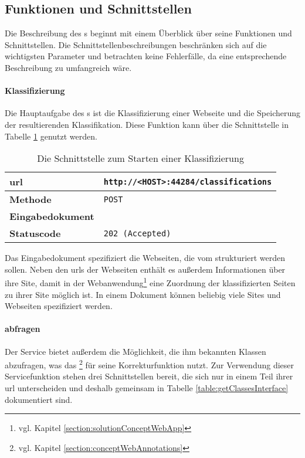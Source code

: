 \subsection{Funktionen und Schnittstellen}
    \label{section:solutionDetailsClassificationServiceFunctions}
    Die Beschreibung des {\classificationService}s beginnt mit einem
    Überblick über seine Funktionen und Schnittstellen.
    Die Schnittstellenbeschreibungen beschränken sich auf die wichtigsten
    Parameter und betrachten keine Fehlerfälle,
    da eine entsprechende Beschreibung zu umfangreich wäre.

    \paragraph*{Klassifizierung}
    Die Hauptaufgabe des {\classificationService}s ist die Klassifizierung einer Webseite
    und die Speicherung der resultierenden Klassifikation.
    Diese Funktion kann über die Schnittstelle in Tabelle \ref{table:startClassificationInterface} genutzt werden.

    \begin{table}[htb]
        \centering
        \begin{tabular}{|l|l|}
        \hline
        \textbf{\gls{url}} & \texttt{http://<HOST>:44284/classifications}\\
        \hline
        \textbf{Methode} & \texttt{POST}\\
        \hline
        \textbf{Eingabedokument} & \\
        \hline
        \textbf{Statuscode} & \texttt{202 (Accepted)}\\
        \hline
        \end{tabular}
        \caption{Die Schnittstelle zum Starten einer Klassifizierung}
        \label{table:startClassificationInterface}
    \end{table}

    Das Eingabedokument spezifiziert die Webseiten,
    die vom {\classificationService} strukturiert werden sollen.
    Neben den \glspl{url} der Webseiten enthält es außerdem Informationen über ihre Site,
    damit in der Webanwendung\footnote{vgl. Kapitel \ref{section:solutionConceptWebApp}}
    eine Zuordnung der klassifizierten Seiten zu ihrer Site möglich ist.
    In einem Dokument können beliebig viele Sites und Webseiten spezifiziert werden.

    \paragraph*{{\classificationModel} abfragen}
    Der Service bietet außerdem die Möglichkeit, die ihm bekannten Klassen abzufragen,
    was das {\annotatorPlugin}\footnote{vgl. Kapitel \ref{section:conceptWebAnnotations}}
    für seine Korrekturfunktion nutzt.
    Zur Verwendung dieser Servicefunktion stehen drei Schnittstellen bereit,
    die sich nur in einem Teil ihrer \gls{url} unterscheiden und deshalb gemeinsam in
    Tabelle \ref{table:getClassesInterface} dokumentiert sind.

